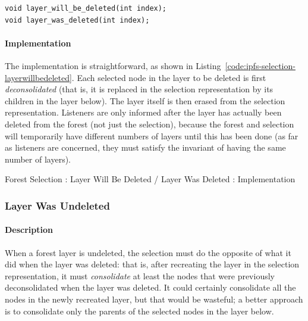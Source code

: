 \begin{lstlisting}[style=Prototype]
void layer_will_be_deleted(int index);
void layer_was_deleted(int index);
\end{lstlisting}

\paragraph{Implementation}

The implementation is straightforward, as shown in Listing~\ref{code:ipfs-selection-layerwillbedeleted}. Each selected node in the layer to be deleted is first \emph{deconsolidated} (that is, it is replaced in the selection representation by its children in the layer below). The layer itself is then erased from the selection representation. Listeners are only informed after the layer has actually been deleted from the forest (not just the selection), because the forest and selection will temporarily have different numbers of layers until this has been done (as far as listeners are concerned, they must satisfy the invariant of having the same number of layers).

\begin{stulisting}[p]
\caption{Forest Selection : Layer Will Be Deleted / Layer Was Deleted : Implementation}
\label{code:ipfs-selection-layerwillbedeleted}

\end{stulisting}

\afterpage{\clearpage}
\newpage

\subsubsection{Layer Was Undeleted}

\paragraph{Description}

When a forest layer is undeleted, the selection must do the opposite of what it did when the layer was deleted: that is, after recreating the layer in the selection representation, it must \emph{consolidate} at least the nodes that were previously deconsolidated when the layer was deleted. It could certainly consolidate all the nodes in the newly recreated layer, but that would be wasteful; a better approach is to consolidate only the parents of the selected nodes in the layer below.

